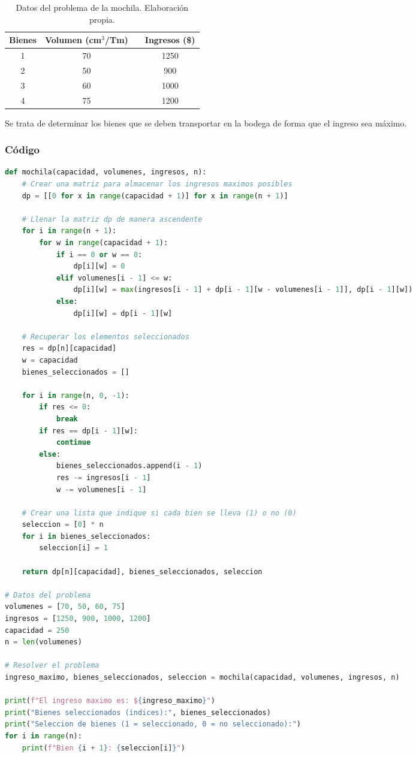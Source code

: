 \begin{table}[H]
    \centering
    \begin{tabular}{cccc}
        \toprule
        \textbf{Bienes} & \textbf{Volumen (cm\(^3\)/Tm)} & & \textbf{Ingresos (\$)} \\
        \midrule
        1 & 70 & & 1250 \\
        2 & 50 & & 900 \\
        3 & 60 & & 1000 \\
        4 & 75 & & 1200 \\
        \bottomrule
    \end{tabular}
    \caption{Datos del problema de la mochila. Elaboración propia.}
    \label{tab:datos_problema}
\end{table}

Se trata de determinar los bienes que se deben transportar en la bodega de forma que el ingreso sea máximo.

\subsubsection{Código}
\begin{lstlisting}[language=Python]
def mochila(capacidad, volumenes, ingresos, n):
    # Crear una matriz para almacenar los ingresos maximos posibles
    dp = [[0 for x in range(capacidad + 1)] for x in range(n + 1)]

    # Llenar la matriz dp de manera ascendente
    for i in range(n + 1):
        for w in range(capacidad + 1):
            if i == 0 or w == 0:
                dp[i][w] = 0
            elif volumenes[i - 1] <= w:
                dp[i][w] = max(ingresos[i - 1] + dp[i - 1][w - volumenes[i - 1]], dp[i - 1][w])
            else:
                dp[i][w] = dp[i - 1][w]

    # Recuperar los elementos seleccionados
    res = dp[n][capacidad]
    w = capacidad
    bienes_seleccionados = []

    for i in range(n, 0, -1):
        if res <= 0:
            break
        if res == dp[i - 1][w]:
            continue
        else:
            bienes_seleccionados.append(i - 1)
            res -= ingresos[i - 1]
            w -= volumenes[i - 1]

    # Crear una lista que indique si cada bien se lleva (1) o no (0)
    seleccion = [0] * n
    for i in bienes_seleccionados:
        seleccion[i] = 1

    return dp[n][capacidad], bienes_seleccionados, seleccion

# Datos del problema
volumenes = [70, 50, 60, 75]
ingresos = [1250, 900, 1000, 1200]
capacidad = 250
n = len(volumenes)

# Resolver el problema
ingreso_maximo, bienes_seleccionados, seleccion = mochila(capacidad, volumenes, ingresos, n)

print(f"El ingreso maximo es: ${ingreso_maximo}")
print("Bienes seleccionados (indices):", bienes_seleccionados)
print("Seleccion de bienes (1 = seleccionado, 0 = no seleccionado):")
for i in range(n):
    print(f"Bien {i + 1}: {seleccion[i]}")
\end{lstlisting}

